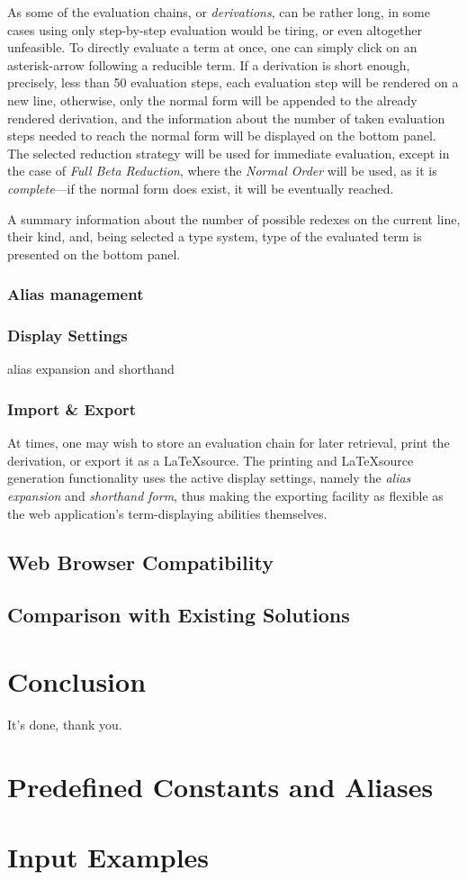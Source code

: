 \documentclass[a4paper,10pt]{article}
\begin{document}
As some of the evaluation chains, or \textit{derivations},
can be rather long, in some cases using
only step-by-step evaluation would be tiring, or even altogether unfeasible.
To directly evaluate a term at once, one can simply click on an asterisk-arrow following
a reducible term. If a derivation is short enough, precisely, less than 50 evaluation steps,
each evaluation step will be rendered on a new line, otherwise, only the normal form
will be appended to the already rendered derivation, and the information
about the number of taken evaluation steps needed to reach the normal form will be
displayed on the bottom panel. The selected reduction strategy 
will be used for immediate evaluation, except in the case of \textit{Full Beta Reduction}, where the
\textit{Normal Order} will be used, as it is \textit{complete}---if the normal form does
exist, it will be eventually reached.

A summary information about the number of possible redexes
on the current line, their kind, and, being selected a type system, type of the evaluated term
is presented on the bottom panel.

\subsubsection{Alias management}

\subsubsection{Display Settings}
alias expansion and shorthand

\subsubsection{Import \& Export} \label{sec:io}
At times, one may wish to store an evaluation chain for later retrieval, print the derivation,
or export it as a \LaTeX\;source.
The printing and \LaTeX\;source generation functionality uses the active display settings,
namely the \textit{alias expansion} and \textit{shorthand form}, thus making the exporting
facility as flexible as the web application's term-displaying abilities themselves.

\subsection{Web Browser Compatibility}
\subsection{Comparison with Existing Solutions}

\section{Conclusion}
It's done, thank you.

\appendix
\section{Predefined Constants and Aliases}
\section{Input Examples}
\end{document}
